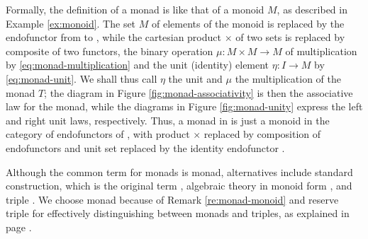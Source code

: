 \begin{remark}
  \label{re:monad-monoid}

  Formally, the definition of a monad is like that of a monoid $M$, as
  described in Example \ref{ex:monoid}. The set $M$ of
  elements of the monoid is replaced by the endofunctor  from
   to , while the cartesian product $\times$ of two sets
  is replaced by composite of two functors, the binary operation $\mu:
  M \times M \to M$ of multiplication by
  \eqref{eq:monad-multiplication} and the unit (identity) element
  $\eta: I \to M$ by \eqref{eq:monad-unit}. We shall thus call $\eta$
  the unit and $\mu$ the multiplication of the monad $T$; the diagram
  in Figure \ref{fig:monad-associativity} is then the associative law
  for the monad, while the diagrams in Figure \ref{fig:monad-unity}
  express the left and right unit laws, respectively. Thus, a monad in
   is just a monoid in the category of endofunctors of ,
  with product $\times$ replaced by composition of endofunctors and
  unit set replaced by the identity endofunctor
  \parencite[138]{maclane-1998}.

\end{remark}


\begin{terminology}
  \label{ter:monad}

  Although the common term for monads is monad, alternatives
  include standard construction, which is the original term
  \parencite[30]{manes-1976}, algebraic theory in monoid form
  \parencite[29]{manes-1976}, and triple
  \parencites[83]{barr-2005}[372]{barr-wells-2012}.
  We choose monad because of Remark
  \ref{re:monad-monoid} and reserve triple for effectively
  distinguishing between monads and triples, as explained in page
  \pageref{ter:triple}.

\end{terminology}


